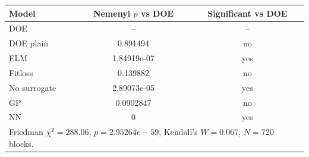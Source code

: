 \begin{tabular}{lcc}
\toprule
Model & Nemenyi $p$ vs DOE & Significant vs DOE \\
\midrule
DOE & -- & -- \\
DOE plain & 0.891494 & no \\
ELM & 1.84919e-07 & yes \\
Fitloss & 0.139882 & no \\
No surrogate & 2.89073e-05 & yes \\
GP & 0.0902847 & no \\
NN & 0 & yes \\
\midrule
\multicolumn{3}{l}{Friedman $\chi^2=288.06$, $p = 2.95264e-59$, Kendall's $W=0.067$, $N=720$ blocks.} \\
\bottomrule
\end{tabular}
